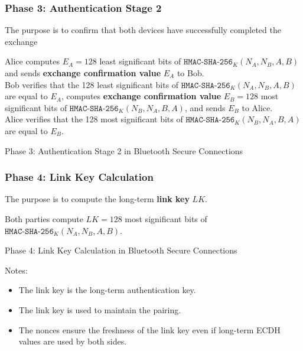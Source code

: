 \documentclass[12pt,titlepage]{article}
\begin{document}
\subsubsection{Phase 3: Authentication Stage 2}
The purpose is to confirm that both devices have successfully completed the exchange
\begin{algorithm}
	Alice computes $E_A = 128$ least significant bits of $\texttt{HMAC-SHA-256}_K (N_A , N_B , A, B)$ and sends \textbf{exchange confirmation value} $E_A$ to Bob.\\
	Bob verifies that the 128 least significant bits of $\texttt{HMAC-SHA-256}_K (N_A , N_B , A, B)$ are equal to $E_A$, computes \textbf{exchange confirmation value} $E_B = 128$ most significant bits of $\texttt{HMAC-SHA-256}_K (N_B , N_A , B, A)$, and sends $E_B$ to Alice.\\
	Alice verifies that the 128 most significant bits of $\texttt{HMAC-SHA-256}_K (N_B , N_A , B, A)$ are equal to $E_B$.
	\caption{Phase 3: Authentication Stage 2 in Bluetooth Secure Connections}
\end{algorithm}
\subsubsection{Phase 4: Link Key Calculation}
The purpose is to compute the long-term \textbf{link key} $LK$.
\newpage
\begin{algorithm}
	Both parties compute $LK = 128$ most significant bits of $\texttt{HMAC-SHA-256}_K (N_A , N_B , A, B)$.
	\caption{Phase 4: Link Key Calculation in Bluetooth Secure Connections}
\end{algorithm}
Notes: \begin{itemize}
	\item The link key is the long-term authentication key.
	\item The link key is used to maintain the pairing.
	\item The nonces ensure the freshness of the link key even if long-term ECDH values are used by both sides.
\end{itemize}
\end{document}
